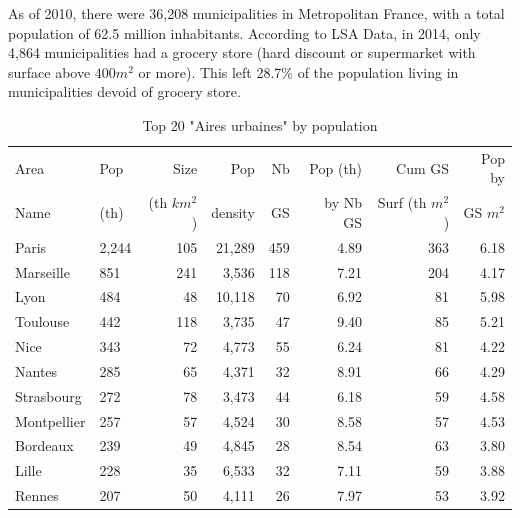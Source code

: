 \documentclass[11pt]{article}
\begin{document}
As of 2010, there were 36,208 municipalities in Metropolitan France, with a total population of 62.5 million inhabitants. According to LSA Data, in 2014, only 4,864 municipalities had a grocery store (hard discount or supermarket with surface above $400m^2$ or more). This left 28.7\% of the population living in municipalities devoid of grocery store.

\begin{table}[H]
\caption{Top 20 "Aires urbaines" by population}
\small
\renewcommand{\arraystretch}{0.7}%

\begin{tabular}{llrrrrrr}
\toprule
Area             &      Pop   &   Size     &  Pop       & Nb         &  Pop (th)  & Cum GS          & Pop by   \\
Name             &      (th)  & (th $km^2$)&  density   & GS         &  by Nb GS  & Surf (th $m^2$) & GS $m^2$ \\
\midrule
         Paris &      2,244 &        105 &       21,289 &        459 &       4.89 &        363 &        6.18 \\
     Marseille &        851 &        241 &        3,536 &        118 &       7.21 &        204 &        4.17 \\
          Lyon &        484 &         48 &       10,118 &         70 &       6.92 &         81 &        5.98 \\
      Toulouse &        442 &        118 &        3,735 &         47 &       9.40 &         85 &        5.21 \\
          Nice &        343 &         72 &        4,773 &         55 &       6.24 &         81 &        4.22 \\
        Nantes &        285 &         65 &        4,371 &         32 &       8.91 &         66 &        4.29 \\
    Strasbourg &        272 &         78 &        3,473 &         44 &       6.18 &         59 &        4.58 \\
   Montpellier &        257 &         57 &        4,524 &         30 &       8.58 &         57 &        4.53 \\
      Bordeaux &        239 &         49 &        4,845 &         28 &       8.54 &         63 &        3.80 \\
         Lille &        228 &         35 &        6,533 &         32 &       7.11 &         59 &        3.88 \\
        Rennes &        207 &         50 &        4,111 &         26 &       7.97 &         53 &        3.92 \\

\end{tabular}
\end{table}
\end{document}
